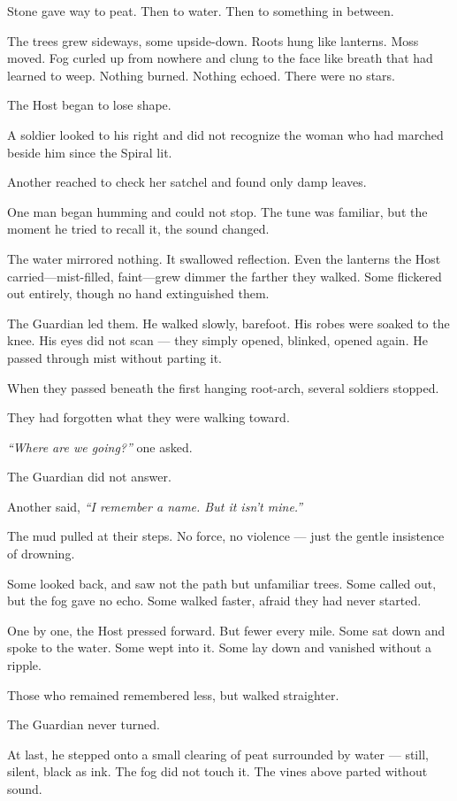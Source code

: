 \documentclass[12pt]{article}
\begin{document}
Stone gave way to peat. Then to water. Then to something in between.

The trees grew sideways, some upside-down. Roots hung like lanterns. Moss moved. Fog curled up from nowhere and clung to the face like breath that had learned to weep. Nothing burned. Nothing echoed. There were no stars.

The Host began to lose shape.

A soldier looked to his right and did not recognize the woman who had marched beside him since the Spiral lit.

Another reached to check her satchel and found only damp leaves.

One man began humming and could not stop. The tune was familiar, but the moment he tried to recall it, the sound changed.

The water mirrored nothing. It swallowed reflection. Even the lanterns the Host carried—mist-filled, faint—grew dimmer the farther they walked. Some flickered out entirely, though no hand extinguished them.

The Guardian led them. He walked slowly, barefoot. His robes were soaked to the knee. His eyes did not scan — they simply opened, blinked, opened again. He passed through mist without parting it.

When they passed beneath the first hanging root-arch, several soldiers stopped.

They had forgotten what they were walking toward.

\textit{``Where are we going?''} one asked.

The Guardian did not answer.

Another said, \textit{``I remember a name. But it isn't mine.''}

The mud pulled at their steps. No force, no violence — just the gentle insistence of drowning.

Some looked back, and saw not the path but unfamiliar trees. Some called out, but the fog gave no echo. Some walked faster, afraid they had never started.

One by one, the Host pressed forward. But fewer every mile. Some sat down and spoke to the water. Some wept into it. Some lay down and vanished without a ripple.

Those who remained remembered less, but walked straighter.

The Guardian never turned.

At last, he stepped onto a small clearing of peat surrounded by water — still, silent, black as ink. The fog did not touch it. The vines above parted without sound.
\end{document}
